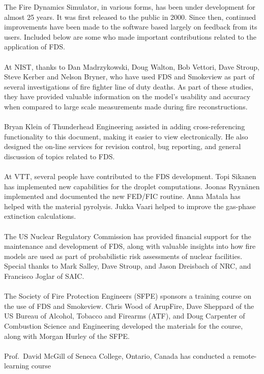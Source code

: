 \documentclass[11pt]{book}
\begin{document}
The Fire Dynamics Simulator, in various forms, has been under development for almost 25 years. It was
first released to the public in 2000. Since then, continued improvements
have been made to the software based largely on feedback from its users.
Included below are some who made important contributions related to the application of FDS. \\
\\
\noindent At NIST, thanks to Dan Madrzykowski, Doug Walton, Bob Vettori, Dave Stroup, Steve Kerber and Nelson Bryner,
who have used FDS and Smokeview as part of several investigations of fire fighter line of duty deaths.
As part of these studies, they have provided valuable information on the model's usability and accuracy
when compared to large scale measurements made during fire reconstructions.\\
\\
\noindent Bryan Klein of Thunderhead Engineering assisted in adding cross-referencing functionality to this document, making it easier to
view electronically. He also designed the on-line services for revision control, bug reporting, and general discussion of topics related to FDS. \\
\\
\noindent At VTT, several people have contributed to the FDS development. Topi Sikanen has implemented new capabilities for
the droplet computations. Joonas Ryyn\"{a}nen implemented and documented the new FED/FIC routine. Anna Matala has helped with the
material pyrolysis. Jukka Vaari helped to improve the gas-phase extinction calculations.\\
\\
\noindent The US Nuclear Regulatory Commission has provided financial support for the maintenance and development of FDS,
along with valuable insights into how fire models are used as part of probabilistic risk assessments of nuclear
facilities. Special thanks to Mark Salley, Dave Stroup, and Jason Dreisbach of NRC, and Francisco Joglar of SAIC.\\
\\
\noindent The Society of Fire Protection Engineers (SFPE) sponsors a training course on the use of FDS and Smokeview.
Chris Wood of ArupFire, Dave Sheppard of the US Bureau of Alcohol, Tobacco and Firearms (ATF), and
Doug Carpenter of Combustion Science and Engineering developed the materials for the course, along with
Morgan Hurley of the SFPE.\\
\\
\noindent Prof.~David McGill of Seneca College, Ontario, Canada has conducted a remote-learning course
\end{document}
